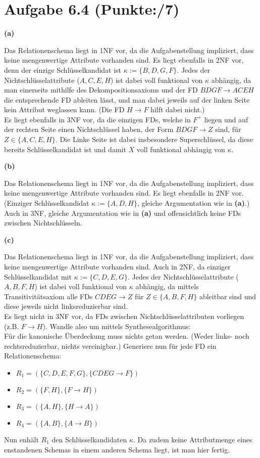 \documentclass[11pt, a4paper]{article}
\newcommand{\blattnummer}{6}
\newcommand{\pppp}{7}
\newcommand{\rA}{\rightarrow}
\newcommand{\aufgabe}[2] {\section*{Aufgabe \blattnummer.#1 (Punkte:\qquad/#2)}}
\newcommand{\aufgabenteil}[1] {\textbf{(#1)}}
\begin{document}
\aufgabe{4}{\pppp}
\aufgabenteil{a}
\begin{adjustwidth}{20pt}{20pt}
	Das Relationenschema liegt in 1NF vor, da die Aufgabenstellung impliziert, dass keine mengenwertige Attribute vorhanden sind. Es liegt ebenfalls in 2NF vor, denn der einzige
	Schlüsselkandidat ist $\kappa :=\{ B,D,G,F\}$. Jedes der Nichtschlüsselattribute ($A,C,E,H$) ist dabei voll funktional von $\kappa$ abhängig, da man einerseits mithilfe
	des Dekompositionsaxioms und der FD $BDGF \rightarrow ACEH$ die entsprechende FD ableiten lässt, und man dabei jeweils auf der linken Seite kein Attribut weglassen kann. (Die FD
	$H \rightarrow F$ hilft dabei nicht.)\\
	Es liegt ebenfalls in 3NF vor, da die einzigen FDs, welche in $F^+$ liegen und auf der rechten Seite einen Nichtschlüssel haben, der Form $BDGF \rA Z$ sind, für $Z \in \{ A,C,E,H\}$.
	Die Linke Seite ist dabei insbesondere Superschlüssel, da diese bereits Schlüsselkandidat ist und damit $X$ voll funktional abhängig von $\kappa$.
\end{adjustwidth}
\aufgabenteil{b}
\begin{adjustwidth}{20pt}{20pt}
	Das Relationenschema liegt in 1NF vor, da die Aufgabenstellung impliziert, dass keine mengenwertige Attribute vorhanden sind. Es liegt ebenfalls in 2NF vor. (Einziger
	Schlüsselkandidat $\kappa :=\{ A,D,H\}$, gleiche Argumentation wie in \textbf{(a)}.) Auch in 3NF, gleiche Argumentation wie in \textbf{(a)} und offensichtlich
	keine FDs zwischen Nichtschlüsseln.
\end{adjustwidth}
\aufgabenteil{c}
\begin{adjustwidth}{20pt}{20pt}
	Das Relationenschema liegt in 1NF vor, da die Aufgabenstellung impliziert, dass keine mengenwertige Attribute vorhanden sind. Auch in 2NF, da einziger Schlüsselkandidat mit
	$\kappa := \{ C,D,E,G\}$. Jedes der Nichtschlüsselattribute ($A,B,F,H$) ist dabei voll funktional von $\kappa$ abhängig, da mittels Transitivitätsaxiom alle FDs $CDEG \rA
	Z$ für $Z \in \{ A,B,F,H\}$ ableitbar sind und diese jeweils nicht linksreduzierbar sind.\\
	Es liegt nicht in 3NF vor, da FDs zwischen Nichtschlüsselattributen vorliegen (z.B. $F \rA H$). Wandle also um mittels Synthesealgorithmus:\\
	Für die kanonische Überdeckung muss nichts getan werden. (Weder links- noch rechtsreduzierbar, nichts vereinigbar.) Generiere nun für jede FD ein Relationenschema:
	\begin{itemize}
	\item $R_1=(\{ C,D,E,F,G\}, \{ CDEG \rA F\})$
	\item $R_2=(\{ F,H\}, \{ F \rA H\})$
	\item $R_3=(\{ A,H\}, \{ H \rA A\})$
	\item $R_4=(\{ A,B\}, \{ A \rA B\})$
	\end{itemize}
	Nun enhält $R_1$ den Schlüsselkandidaten $\kappa$. Da zudem keine Attributmenge eines enstandenen Schemas in einem anderen Schema liegt, ist man hier fertig.
\end{adjustwidth}
\end{document}
